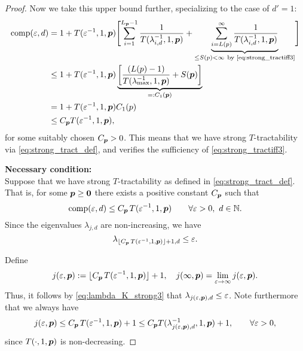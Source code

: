 \documentclass[11pt,a4paper]{article}
\begin{document}
\begin{proof}
Now we take this upper bound further, specializing to the case of $d'=1$:
\begin{align*}
       \operatorname{comp}(\varepsilon,d)
       & = 1 + T(\varepsilon^{-1},1, \boldsymbol{p}) \Biggl [ \sum_{i=1}^{L_{\boldsymbol{p}}-1} \frac{1}{T(\lambda_{i, d}^{-1},1,\boldsymbol{p})}
       + \underbrace{\sum_{i=L(p)}^\infty \frac{1}{T(\lambda_{i, d}^{-1},1,\boldsymbol{p})}}_{\le S(p) <\infty\ \text{by \eqref{eq:strong_tractiff3}} }\Biggr] \\
       & \le 1+ T(\varepsilon^{-1},1,\boldsymbol{p}) \underbrace{\left[\frac{(L(p)-1)}{T(\lambda_{\max}^{-1},1,\boldsymbol{p})} + S(\boldsymbol{p})\right]}_{=:C_1(\boldsymbol{p})}\\
       & = 1+ T(\varepsilon^{-1},1,\boldsymbol{p}) C_1 (p)\\
       &\le C_{\boldsymbol{p}} T(\varepsilon^{-1},1,\boldsymbol{p}),
\end{align*}
for some suitably chosen $C_{\boldsymbol{p}}>0$. This means that we have strong $T$-tractability via \eqref{eq:strong_tract_def}, and verifies the sufficiency of \eqref{eq:strong_tractiff3}.



\bigskip
\noindent \textbf{Necessary condition:} \\
Suppose that we have strong
$T$-tractability as defined in \eqref{eq:strong_tract_def}. That is, for some $\boldsymbol{p} \ge \boldsymbol{0}$ there exists a positive constant $C_{\boldsymbol{p}}$ such that
\[
\operatorname{comp}(\varepsilon,d)\le C_{\boldsymbol{p}}\, T(\varepsilon^{-1},1,\boldsymbol{p})
\qquad \forall \varepsilon > 0, \ d \in \mathbb{N}.
\]
Since the eigenvalues $\lambda_{j,d}$ are non-increasing, we have
\begin{equation}\label{eq:lambda_K_strong3}
\lambda_{\lfloor C_{\boldsymbol{p}}\, T(\varepsilon^{-1},1,\boldsymbol{p})\rfloor +1,d}\le \varepsilon.
\end{equation}

Define
\[
j (\varepsilon,\boldsymbol{p}):= \lfloor C_{\boldsymbol{p}}\, T(\varepsilon^{-1},1,\boldsymbol{p})\rfloor +1, \quad
j (\infty,\boldsymbol{p}) = \lim_{\varepsilon \to \infty} j (\varepsilon,\boldsymbol{p}) .
\]
Thus, it follows by \eqref{eq:lambda_K_strong3} that $\lambda_{j(\varepsilon,\boldsymbol{p}),d} \le \varepsilon$.
Note furthermore that we always have
\[
j(\varepsilon,\boldsymbol{p})\le C_{\boldsymbol{p}}\, T(\varepsilon^{-1},1,\boldsymbol{p})+1 \le C_{\boldsymbol{p}} T(\lambda_{j(\varepsilon,\boldsymbol{p}),d}^{-1},1,\boldsymbol{p})+1, \qquad \forall \varepsilon > 0,
\]
since
$T(\cdot,1, \boldsymbol{p})$ is non-decreasing.


\end{proof}
\end{document}

